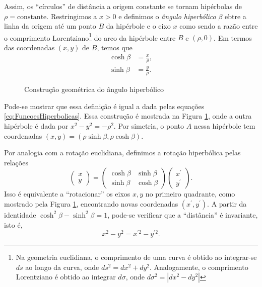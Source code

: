 Assim, os ``círculos'' de distância a origem constante se tornam hipérbolas de $\rho=\text{constante}$. Restringimos a $x>0$ e definimos o \textit{ângulo hiperbólico} $\beta$ ebtre a linha da origem até um ponto $B$ da hipérbole e o eixo $x$ como sendo a razão entre o comprimento Lorentziano\footnote{Na geometria euclidiana, o comprimento de uma curva é obtido ao integrar-se $ds$ ao longo da curva, onde $ds^2=dx^2+dy^2$. Analogamente, o comprimento Lorentziano é obtido ao integrar $d\sigma$, onde $d\sigma^2=|dx^2-dy^2|$} do arco da hipérbole entre $B$ e $(\rho,0)$. Em termos das coordenadas $(x,y)$ de $B$, temos que
\begin{align}\label{eq:AnguloHiperbolico}
    \cosh\beta &= \frac{x}{\rho} ,\\
    \sinh\beta &= \frac{y}{\rho} .
\end{align}

\begin{figure}[t]
    \centering
    \caption{Construção geométrica do ângulo hiperbólico}
    \label{fig:Hiperbole}
\end{figure}

Pode-se mostrar que essa definição é igual a dada pelas equações \eqref{eq:FuncoesHiperbolicas}. Essa construção é mostrada na Figura \ref{fig:Hiperbole}, onde a outra hipérbole é dada por $x^2-y^2=-\rho^2$. Por simetria, o ponto $A$ nessa hipérbole tem coordenadas $(x,y) = (\rho\sinh\beta,\rho\cosh\beta)$.

Por analogia com a rotação euclidiana, definimos a rotação hiperbólica pelas relações
\begin{equation}\label{eq:RotacaoHiperbolica}
\left(\begin{array}{l}{x} \\ {y}\end{array}\right)=\left(\begin{array}{ll}{\cosh \beta} & {\sinh \beta} \\ {\sinh \beta} & {\cosh \beta}\end{array}\right)\left(\begin{array}{l}{x^{\prime}} \\ {y^{\prime}}\end{array}\right) .
\end{equation}
Isso é equivalente a ``rotacionar'' os eixos $x, y$ no primeiro quadrante, como mostrado pela Figura \ref{fig:Hiperbole}, encontrando novas coordenadas $(x^\prime,y^\prime)$. A partir da identidade $\cosh^2\beta-\sinh^2\beta=1$, pode-se verificar que a ``distância'' é invariante, isto é,
\begin{equation}\label{eq:InvarianciaDistanciaHiperbolica}
    x^2-y^2=x^{\prime2}-y^{\prime 2} .
\end{equation}

